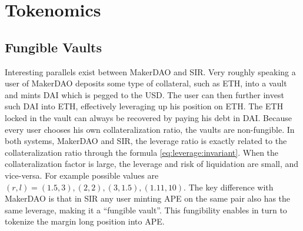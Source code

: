 \documentclass[journal,letterpaper,oneside,onecolumn,12pt]{IEEEtran}
\begin{document}
	
	

	
	
	
	\section{Tokenomics}
	
	
	
	\subsection{Fungible Vaults}
	
	Interesting parallels exist between MakerDAO and SIR. Very roughly speaking a user of MakerDAO deposits some type of collateral, such as ETH, into a vault and mints DAI which is pegged to the USD. The user can then further invest such DAI into ETH, effectively leveraging up his position on ETH. The ETH locked in the vault can always be recovered by paying his debt in DAI. Because every user chooses his own collateralization ratio, the vaults are non-fungible.
	In both systems, MakerDAO and SIR, the leverage ratio is exactly related to the collateralization ratio through the formula \eqref{eq:leverage:invariant}. When the collateralization factor is large, the leverage and risk of liquidation are small, and vice-versa. For example possible values are $(r,l)=(1.5,3),(2,2),(3,1.5),(1.11,10)$. 
	The key difference with MakerDAO is that in SIR any user minting APE on the same pair also has the same leverage, making it a ``fungible vault''. This fungibility enables in turn to tokenize the margin long position into APE.
\end{document}

